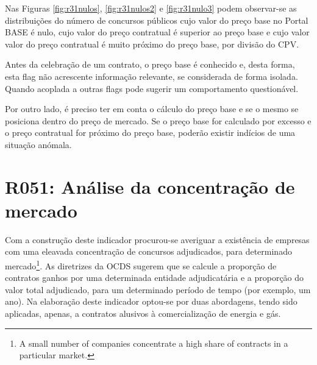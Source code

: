 \begin{table}[H]
	\centering
	\renewcommand{\arraystretch}{1.15}
	\setlength{\tabcolsep}{15pt}
	\caption{Número de contratos sinalizados e respetivas percentagens.}
	\label{tab:r31vales}
\end{table}

Nas Figuras \ref{fig:r31nulos}, \ref{fig:r31nulos2} e \ref{fig:r31nulo3} podem observar-se as distribuições do número de concursos públicos cujo valor do preço base no Portal BASE é nulo, cujo valor do preço contratual é superior ao preço base e cujo valor valor do preço contratual é muito próximo do preço base, por divisão do CPV.

Antes da celebração de um contrato, o preço base é conhecido e, desta forma, esta flag não acrescente informação relevante, se considerada de forma isolada. Quando acoplada a outras flags pode sugerir um comportamento questionável. 

Por outro lado, é preciso ter em conta o cálculo do preço base e se o mesmo se posiciona dentro do preço de mercado. Se o preço base for calculado por excesso e o preço contratual for próximo do preço base, poderão existir indícios de uma situação anómala.





\section{R051: Análise da concentração de mercado}


Com a construção deste indicador procurou-se averiguar a existência de empresas com uma eleavada concentração de concursos adjudicados, para determinado mercado\footnote{A small number of companies concentrate a high share of contracts in a particular market.}. 
As diretrizes da OCDS sugerem que se calcule a proporção de contratos ganhos por uma determinada entidade adjudicatária e a proporção do valor total adjudicado, para um determinado período de tempo (por exemplo, um ano). Na elaboração deste indicador optou-se por duas abordagens, tendo sido aplicadas, apenas, a contratos alusivos à comercialização de energia e gás.


